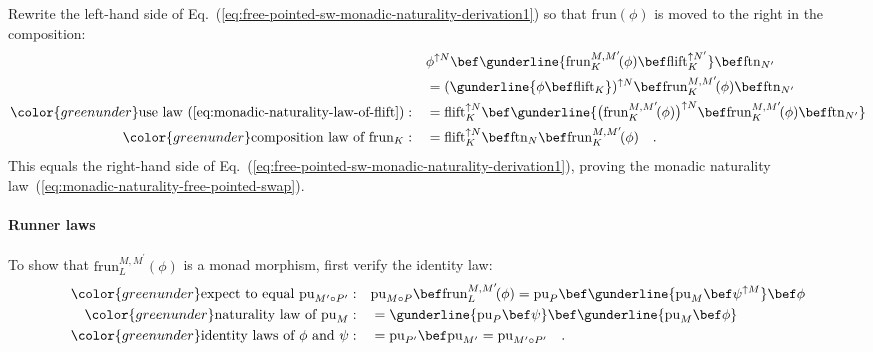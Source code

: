 Rewrite the left-hand side of Eq.~(\ref{eq:free-pointed-sw-monadic-naturality-derivation1})
so that $\text{frun}\left(\phi\right)$ is moved to the right in the
composition:
\begin{align*}
 & \phi^{\uparrow N}\bef\gunderline{\text{frun}_{K}^{M,M^{\prime}}\!(\phi)\bef\text{flift}_{K}^{\uparrow N^{\prime}}}\bef\text{ftn}_{N^{\prime}}\\
 & =(\gunderline{\phi\bef\text{flift}_{K}})^{\uparrow N}\bef\text{frun}_{K}^{M,M^{\prime}}\!(\phi)\bef\text{ftn}_{N^{\prime}}\\
{\color{greenunder}\text{use law~(\ref{eq:monadic-naturality-law-of-flift})}:}\quad & =\text{flift}_{K}^{\uparrow N}\bef\gunderline{\big(\text{frun}_{K}^{M,M^{\prime}}\!(\phi)\big)^{\uparrow N}\bef\text{frun}_{K}^{M,M^{\prime}}\!(\phi)\bef\text{ftn}_{N^{\prime}}}\\
{\color{greenunder}\text{composition law of }\text{frun}_{K}:}\quad & =\text{flift}_{K}^{\uparrow N}\bef\text{ftn}_{N}\bef\text{frun}_{K}^{M,M^{\prime}}\!(\phi)\quad.
\end{align*}
This equals the right-hand side of Eq.~(\ref{eq:free-pointed-sw-monadic-naturality-derivation1}),
proving the monadic naturality law~(\ref{eq:monadic-naturality-free-pointed-swap}).

\paragraph{Runner laws}

To show that $\text{frun}_{L}^{M,M^{\prime}}(\phi)$ is a monad morphism,
first verify the identity law:
\begin{align*}
{\color{greenunder}\text{expect to equal }\text{pu}_{M^{\prime}\circ P^{\prime}}:}\quad & \text{pu}_{M\circ P}\bef\text{frun}_{L}^{M,M^{\prime}}\!(\phi)=\text{pu}_{P}\bef\gunderline{\text{pu}_{M}\bef\psi^{\uparrow M}}\bef\phi\\
{\color{greenunder}\text{naturality law of }\text{pu}_{M}:}\quad & =\gunderline{\text{pu}_{P}\bef\psi}\bef\gunderline{\text{pu}_{M}\bef\phi}\\
{\color{greenunder}\text{identity laws of }\phi\text{ and }\psi:}\quad & =\text{pu}_{P^{\prime}}\bef\text{pu}_{M^{\prime}}=\text{pu}_{M^{\prime}\circ P^{\prime}}\quad.
\end{align*}

